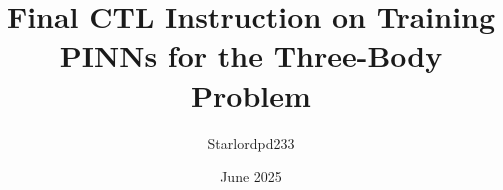 \usepackage[utf8]{inputenc}
\usepackage{amsmath}
\usepackage{amssymb}
\usepackage{booktabs}
\usepackage{geometry}
\geometry{a4paper, margin=1in}
\usepackage{hyperref}
\usepackage{comment}
\hypersetup{
    colorlinks=true,
    linkcolor=blue,
    filecolor=magenta,
    urlcolor=cyan,
}
\usepackage{url}
\usepackage{algorithm}
\usepackage{algpseudocode}
\usepackage{listings}
\lstset{
    showstringspaces=false,
}
\usepackage{float}
\usepackage{makecell}
\renewcommand\theadfont{\bfseries}
\usepackage[dvipsnames]{xcolor}
\usepackage{tikz}
\usetikzlibrary{shapes.geometric, arrows.meta,
  positioning}

\DeclareMathOperator{\median}{median}

\newcommand{\authcomment}[1]{\textcolor{Red}{\textbf{[#1]}}}

\newenvironment{authcommentenv}
  {\par\begingroup\color{Red}\bfseries[}%
  {]\endgroup\par}%

\title{Final CTL Instruction on Training PINNs for the Three-Body Problem}
\author{Starlordpd233}
\date{June 2025}
